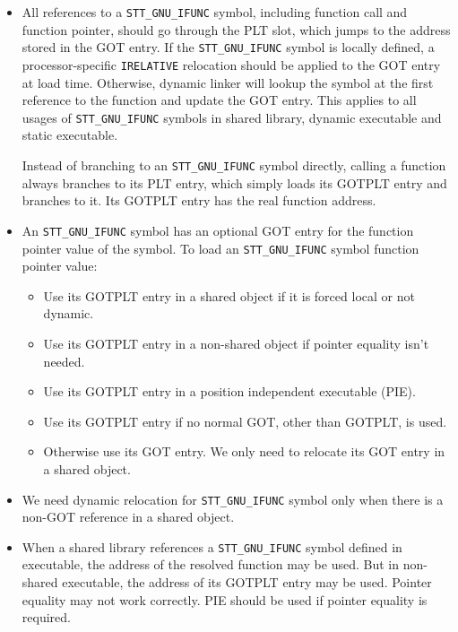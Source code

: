 \begin{itemize}
\item All references to a \texttt{STT_GNU_IFUNC} symbol, including
function call and function pointer, should go through the PLT slot,
which jumps to the address stored in the GOT entry.  If the
\texttt{STT_GNU_IFUNC} symbol is locally defined, a processor-specific
\texttt{IRELATIVE} relocation should be applied to the GOT entry at load
time.  Otherwise, dynamic linker will lookup the symbol at the first
reference to the function and update the GOT entry.  This applies to all
usages of \texttt{STT_GNU_IFUNC} symbols in shared library, dynamic
executable and static executable.

Instead of branching to an \texttt{STT_GNU_IFUNC} symbol directly, calling
a function always branches to its PLT entry, which simply loads its GOTPLT
entry and branches to it.  Its GOTPLT entry has the real function address.

\item An \texttt{STT_GNU_IFUNC} symbol has an optional GOT entry for the
function pointer value of the symbol.  To load an \texttt{STT_GNU_IFUNC}
symbol function pointer value:

  \begin{itemize}
  \item Use its GOTPLT entry in a shared object if it is forced local or
        not dynamic.
  \item Use its GOTPLT entry in a non-shared object if pointer equality
        isn't needed.
  \item Use its GOTPLT entry in a position independent executable (PIE).
  \item Use its GOTPLT entry if no normal GOT, other than GOTPLT, is used.
  \item Otherwise use its GOT entry.  We only need to relocate its GOT
        entry in a shared object.
  \end{itemize}

\item We need dynamic relocation for \texttt{STT_GNU_IFUNC} symbol only
when there is a non-GOT reference in a shared object.

\item When a shared library references a \texttt{STT_GNU_IFUNC} symbol
defined in executable, the address of the resolved function may be used.
But in non-shared executable, the address of its GOTPLT entry may be used.
Pointer equality may not work correctly.  PIE should be used if pointer
equality is required.
\end{itemize}

